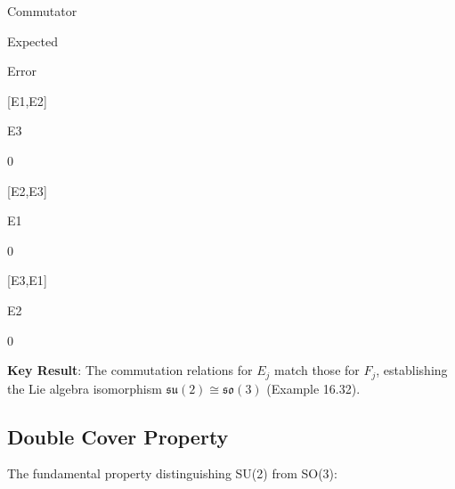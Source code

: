 \documentclass[
]{book}
\theoremstyle{definition}
\theoremstyle{definition}
\theoremstyle{definition}
\theoremstyle{definition}
\theoremstyle{remark}
\begin{document}
Commutator

Expected

Error

{[}E1,E2{]}

E3

0

{[}E2,E3{]}

E1

0

{[}E3,E1{]}

E2

0

\textbf{Key Result}: The commutation relations for \(E_j\) match those for \(F_j\), establishing the Lie algebra isomorphism \(\mathfrak{su}(2) \cong \mathfrak{so}(3)\) (Example 16.32).

\subsection{Double Cover Property}\label{double-cover-property}

The fundamental property distinguishing SU(2) from SO(3):
\end{document}
